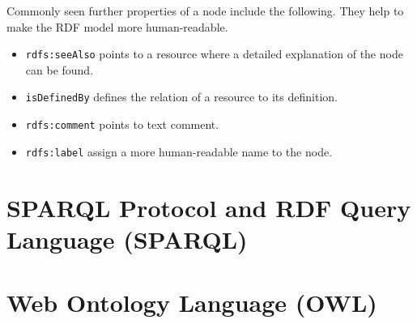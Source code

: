 Commonly seen further properties of a node include the following. They help to make the RDF model more human-readable.
\begin{itemize}
	\item \verb|rdfs:seeAlso| points to a resource where a detailed explanation of the node can be found.
	\item \verb|isDefinedBy| defines the relation of a resource to its definition.
	\item \verb|rdfs:comment| points to text comment.
	\item \verb|rdfs:label| assign a more human-readable name to the node.
\end{itemize}













\section{SPARQL Protocol and RDF Query Language (SPARQL)}

\section{Web Ontology Language (OWL)}
